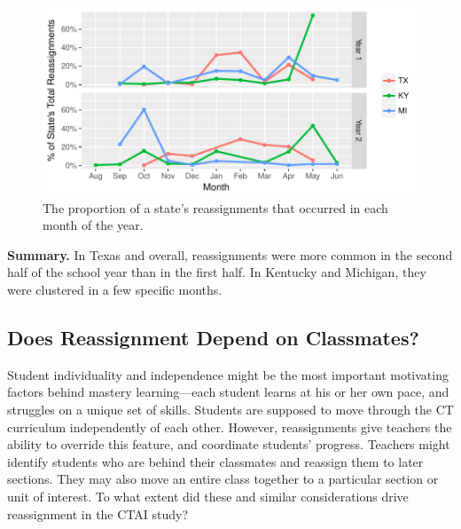 \documentclass[12pt]{article}\usepackage[]{graphicx}\usepackage[]{color}
\makeatletter
\def\maxwidth{ %
  \ifdim\Gin@nat@width>\linewidth
    \linewidth
  \else
    \Gin@nat@width
  \fi
}
\makeatother
\begin{document}
\begin{figure}
  \centering

\includegraphics[width=\maxwidth]{figure/byMonthState-1} 

\caption{The proportion of a state's reassignments that occurred in
  each month of the year.}
\label{fig:byMonthState}
\end{figure}

\textbf{Summary.} In Texas and overall, reassignments were more common
in the second half of the school year than in the first half. In
Kentucky and Michigan, they were clustered in a few specific months.

\subsection{Does Reassignment Depend on Classmates?}

Student individuality and independence might be the most important
motivating factors behind mastery learning---each student learns at
his or her own pace, and struggles on a unique set of skills.
Students are supposed to move through the CT curriculum independently
of each other.
However, reassignments give teachers the ability to override this
feature, and coordinate students' progress.
Teachers might identify students who are behind their classmates and
reassign them to later sections.
They may also move an entire class together to a particular section or
unit of interest.
To what extent did these and similar considerations drive reassignment
in the CTAI study?
\end{document}
